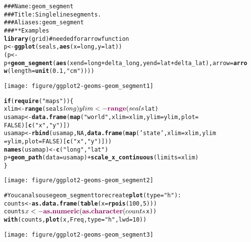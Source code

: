 \documentclass[a4paper,titlepage]{tufte-handout}\usepackage{graphicx, color}
\makeatletter
\def\maxwidth{ %
  \ifdim\Gin@nat@width>\linewidth
    \linewidth
  \else
    \Gin@nat@width
  \fi
}
\newcommand{\hlfunctioncall}[1]{\textcolor[rgb]{0.501960784313725,0,0.329411764705882}{\textbf{#1}}}%
\newcommand{\hlstring}[1]{\textcolor[rgb]{0.6,0.6,1}{#1}}%
\newcommand{\hlcomment}[1]{\textcolor[rgb]{0.180392156862745,0.6,0.341176470588235}{#1}}%
\newenvironment{kframe}{%
 \def\at@end@of@kframe{}%
 \ifinner\ifhmode%
  \def\at@end@of@kframe{\end{minipage}}%
  \begin{minipage}{\columnwidth}%
 \fi\fi%
 \def\FrameCommand##1{\hskip\@totalleftmargin \hskip-\fboxsep
 \colorbox{shadecolor}{##1}\hskip-\fboxsep
     \hskip-\linewidth \hskip-\@totalleftmargin \hskip\columnwidth}%
 \MakeFramed {\advance\hsize-\width
   \@totalleftmargin\z@ \linewidth\hsize
   \@setminipage}}%
 {\par\unskip\endMakeFramed%
 \at@end@of@kframe}
\newenvironment{knitrout}{}{} %
\makeatother
\begin{document}
\begin{knitrout}
\color{fgcolor}\begin{kframe}
\begin{alltt}
\hlcomment{### Name: geom_segment}
\hlcomment{### Title: Single line segments.}
\hlcomment{### Aliases: geom_segment}
\hlcomment{### ** Examples}
\hlfunctioncall{library}(grid) \hlcomment{# needed for arrow function}
p <- \hlfunctioncall{ggplot}(seals, \hlfunctioncall{aes}(x = long, y = lat))
(p <- p + \hlfunctioncall{geom_segment}(\hlfunctioncall{aes}(xend = long + delta_long, yend = lat + delta_lat), arrow = \hlfunctioncall{arrow}(length = \hlfunctioncall{unit}(0.1,\hlstring{"cm"}))))
\end{alltt}
\end{kframe}\texttt{[image: figure/ggplot2-geoms-geom\_segment1]} \begin{kframe}\begin{alltt}
\hlfunctioncall{if} (\hlfunctioncall{require}(\hlstring{"maps"})) \{
xlim <- \hlfunctioncall{range}(seals$long)
ylim <- \hlfunctioncall{range}(seals$lat)
usamap <- \hlfunctioncall{data.frame}(\hlfunctioncall{map}(\hlstring{"world"}, xlim = xlim, ylim = ylim, plot =
FALSE)[\hlfunctioncall{c}(\hlstring{"x"},\hlstring{"y"})])
usamap <- \hlfunctioncall{rbind}(usamap, NA, \hlfunctioncall{data.frame}(\hlfunctioncall{map}(\hlstring{'state'}, xlim = xlim, ylim
= ylim, plot = FALSE)[\hlfunctioncall{c}(\hlstring{"x"},\hlstring{"y"})]))
\hlfunctioncall{names}(usamap) <- \hlfunctioncall{c}(\hlstring{"long"}, \hlstring{"lat"})
p + \hlfunctioncall{geom_path}(data = usamap) + \hlfunctioncall{scale_x_continuous}(limits = xlim)
\}
\end{alltt}
\end{kframe}\texttt{[image: figure/ggplot2-geoms-geom\_segment2]} \begin{kframe}\begin{alltt}
# You can also use geom_segment to recreate \hlfunctioncall{plot}(type = \hlstring{"h"}) :
counts <- \hlfunctioncall{as.data.frame}(\hlfunctioncall{table}(x = \hlfunctioncall{rpois}(100,5)))
counts$x <- \hlfunctioncall{as.numeric}(\hlfunctioncall{as.character}(counts$x))
\hlfunctioncall{with}(counts, \hlfunctioncall{plot}(x, Freq, type = \hlstring{"h"}, lwd = 10))
\end{alltt}
\end{kframe}\texttt{[image: figure/ggplot2-geoms-geom\_segment3]} \begin{kframe}\begin{alltt}

\end{alltt}
\end{kframe}
\end{knitrout}
\end{document}
